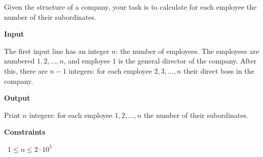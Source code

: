Given the structure of a company, your task is to calculate for each employee the number of their subordinates.

\vspace{0.3cm}\noindent\textbf{Input}

The first input line has an integer $n$: the number of employees. The employees are numbered $1,2,\dots,n$, and employee $1$ is the general director of the company.
After this, there are $n-1$ integers: for each employee $2,3,\dots,n$ their direct boss in the company.

\vspace{0.3cm}\noindent\textbf{Output}

Print $n$ integers: for each employee $1,2,\dots,n$ the number of their subordinates.

\vspace{0.3cm}\noindent\textbf{Constraints}

\textbullet\ $1 \le n \le 2 \cdot 10^5$